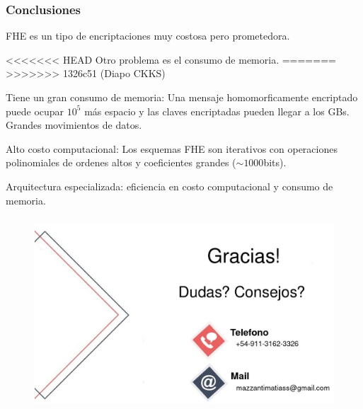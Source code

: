 \documentclass[10pt]{beamer}
\begin{document}
\begin{frame}
\frametitle{Conclusiones}
FHE es un tipo de encriptaciones muy costosa pero prometedora.

<<<<<<< HEAD
Otro problema es el consumo de memoria.
=======
>>>>>>> 1326c51 (Diapo CKKS)

\pause
Tiene un gran consumo de memoria:
\pause
Una mensaje homomorficamente encriptado puede ocupar $10^5$ más espacio y las claves encriptadas pueden llegar a los GBs.
Grandes movimientos de datos.

\pause
Alto costo computacional:
\pause
  Los esquemas FHE son iterativos con operaciones polinomiales de ordenes altos y coeficientes grandes ($\sim 1000$bits).

\pause
\begin{mdframed}[backgroundcolor=frenchblue!20]
  Arquitectura especializada: eficiencia en costo computacional y consumo de memoria.
\end{mdframed}

\end{frame}

\begin{frame}
\frametitle{}
  \begin{figure}[h!]
      \centering
      \includegraphics[scale=0.3]{agradecimientos.jpg}
  \end{figure}
\end{frame}
\end{document}

